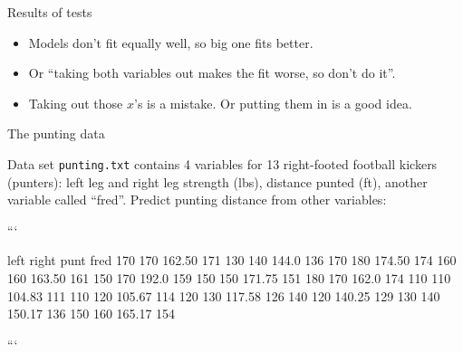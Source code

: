\documentclass[ignorenonframetext,]{beamer}
\begin{document}
\begin{frame}{Results of tests}
\protect\hypertarget{results-of-tests}{}

\begin{itemize}
\item
  Models don't fit equally well, so big one fits better.
\item
  Or ``taking both variables out makes the fit worse, so don't do it''.
\item
  Taking out those \(x\)'s is a mistake. Or putting them in is a good
  idea.
\end{itemize}

\end{frame}

\begin{frame}[fragile]{The punting data}
\protect\hypertarget{the-punting-data}{}

Data set \texttt{punting.txt} contains 4 variables for 13 right-footed
football kickers (punters): left leg and right leg strength (lbs),
distance punted (ft), another variable called ``fred''. Predict punting
distance from other variables:

\begin{scriptsize}

```

left                right               punt         fred
170               170                162.50       171 
130               140                144.0        136   
170               180                174.50       174 
160               160                163.50       161 
150               170                192.0        159 
150               150                171.75       151 
180               170                162.0        174 
110               110                104.83       111 
110               120                105.67       114 
120               130                117.58       126 
140               120                140.25       129  
130               140                150.17       136 
150               160                165.17       154 

```

\end{scriptsize}

\end{frame}
\end{document}
